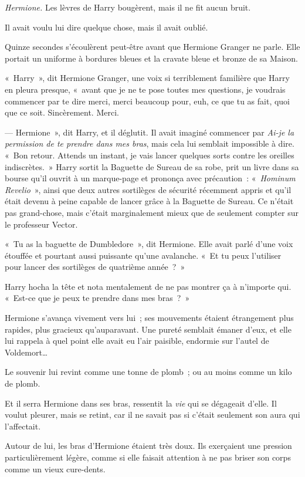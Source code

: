\emph{Hermione.} Les lèvres de Harry bougèrent, mais il ne fit aucun bruit.

Il avait voulu lui dire quelque chose, mais il avait oublié.

Quinze secondes s'écoulèrent peut-être avant que Hermione Granger ne parle. Elle portait un uniforme à bordures bleues et la cravate bleue et bronze de sa Maison.

«~Harry~», dit Hermione Granger, une voix si terriblement familière que Harry en pleura presque, «~avant que je ne te pose toutes mes questions, je voudrais commencer par te dire merci, merci beaucoup pour, euh, ce que tu as fait, quoi que ce soit. Sincèrement. Merci.

--- Hermione~», dit Harry, et il déglutit. Il avait imaginé commencer par \emph{Ai-je la permission de te prendre dans mes bras}, mais cela lui semblait impossible à dire. «~Bon retour. Attends un instant, je vais lancer quelques sorts contre les oreilles indiscrètes.~» Harry sortit la Baguette de Sureau de sa robe, prit un livre dans sa bourse qu'il ouvrit à un marque-page et prononça avec précaution~: «~\emph{Hominum Revelio}~», ainsi que deux autres sortilèges de sécurité récemment appris et qu'il était devenu à peine capable de lancer grâce à la Baguette de Sureau. Ce n'était pas grand-chose, mais c'était marginalement mieux que de seulement compter sur le professeur Vector.

«~Tu as la baguette de Dumbledore~», dit Hermione. Elle avait parlé d'une voix étouffée et pourtant aussi puissante qu'une avalanche. «~Et tu peux l'utiliser pour lancer des sortilèges de quatrième année~?~»

Harry hocha la tête et nota mentalement de ne pas montrer ça à n'importe qui. «~Est-ce que je peux te prendre dans mes bras~?~»

Hermione s'avança vivement vers lui~; ses mouvements étaient étrangement plus rapides, plus gracieux qu'auparavant. Une pureté semblait émaner d'eux, et elle lui rappela à quel point elle avait eu l'air paisible, endormie sur l'autel de Voldemort…

Le souvenir lui revint comme une tonne de plomb~; ou au moins comme un kilo de plomb.

Et il serra Hermione dans ses bras, ressentit la \emph{vie} qui se dégageait d'elle. Il voulut pleurer, mais se retint, car il ne savait pas si c'était seulement son aura qui l'affectait.

Autour de lui, les bras d'Hermione étaient très doux. Ils exerçaient une pression particulièrement légère, comme si elle faisait attention à ne pas briser son corps comme un vieux cure-dents.

